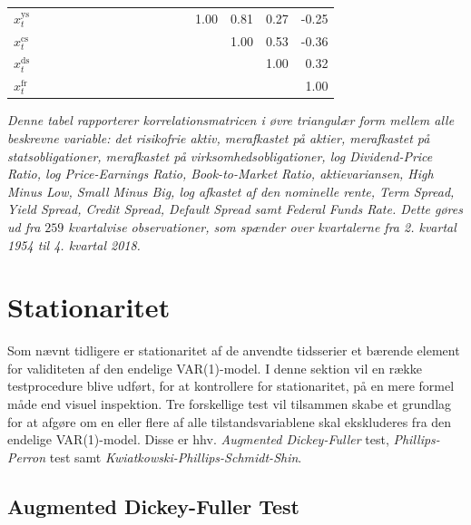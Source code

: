 \documentclass[
  a4paper,
  oneside]{memoir}
\begin{document}
\begin{table}[H]
{\begin{threeparttable}
\begin{tabular}[t]{lrrrrrrrrrrrrrrrr}
\rowcolor{gray!6}  $x_t^{\text{ys}}$ &  &  &  &  &  &  &  &  &  &  &  &  & 1.00 & 0.81 & 0.27 & -0.25\\
$x_t^{\text{cs}}$ &  &  &  &  &  &  &  &  &  &  &  &  &  & 1.00 & 0.53 & -0.36\\
\rowcolor{gray!6}  $x_t^{\text{ds}}$ &  &  &  &  &  &  &  &  &  &  &  &  &  &  & 1.00 & 0.32\\
$x_t^{\text{fr}}$ &  &  &  &  &  &  &  &  &  &  &  &  &  &  &  & 1.00\\
\bottomrule
\end{tabular}
\begin{tablenotes}
\item \textit{Denne tabel rapporterer korrelationsmatricen i øvre triangulær form mellem alle beskrevne variable: det risikofrie aktiv, merafkastet på aktier, merafkastet på statsobligationer, merafkastet på virksomhedsobligationer, log Dividend-Price Ratio, log Price-Earnings Ratio, Book-to-Market Ratio, aktievariansen, High Minus Low, Small Minus Big, log afkastet af den nominelle rente, Term Spread, Yield Spread, Credit Spread, Default Spread samt Federal Funds Rate. Dette gøres ud fra $259$ kvartalvise observationer, som spænder over kvartalerne fra 2. kvartal 1954 til 4. kvartal 2018.}
\end{tablenotes}
\end{threeparttable}}
\end{table}

\hypertarget{stationar}{%
\section{Stationaritet}\label{stationar}}

Som nævnt tidligere er stationaritet af de anvendte tidsserier et bærende element for validiteten af den endelige VAR(1)-model. I denne sektion vil en række testprocedure blive udført, for at kontrollere for stationaritet, på en mere formel måde end visuel inspektion. Tre forskellige test vil tilsammen skabe et grundlag for at afgøre om en eller flere af alle tilstandsvariablene skal ekskluderes fra den endelige VAR(1)-model. Disse er hhv. \emph{Augmented Dickey-Fuller} test, \emph{Phillips-Perron} test samt \emph{Kwiatkowski-Phillips-Schmidt-Shin}.

\hypertarget{augdickful}{%
\subsection{Augmented Dickey-Fuller Test}\label{augdickful}}
\end{document}
